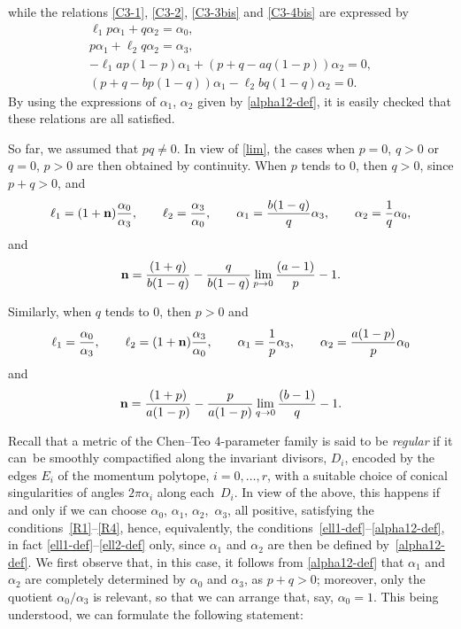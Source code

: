 \documentclass[10pt,a4paper]{amsart}
\numberwithin{equation}{section}
\begin{document}
while the relations \eqref{C3-1}, \eqref{C3-2}, \eqref{C3-3bis} and \eqref{C3-4bis} are expressed by
\begin{gather} \ell _1 p \alpha _1 + q \alpha _2 = \alpha _0, \label{R1}\\
 p \alpha _1 + \ell _2 q \alpha _2 = \alpha _3, \label{R2}\\
 - \ell _1 a p (1 - p) \alpha _1 + (p + q - a q (1 - p)) \alpha _2 = 0, \label{R3}\\
 (p + q - b p (1 - q)) \alpha _1 - \ell _2 b q (1 - q) \alpha _2 = 0.\label{R4} \end{gather}
By using the expressions of $\alpha _1$, $\alpha _2$ given by \eqref{alpha12-def}, it is easily checked that these relations are all satisfied.

 So far, we assumed that $p q \neq 0$. In view of \eqref{lim}, the cases when $p = 0$, $q > 0$ or $q = 0$, $p > 0$ are then obtained by continuity. When $p$ tends to $0$, then $q > 0$, since $p + q > 0$, and
\begin{gather*} \ell _1 = (1 + {\bf n}) \frac{\alpha _0}{\alpha _3}, \qquad \ell _2 = \frac{\alpha _3}{\alpha _0}, \qquad
 \alpha _1 = \frac{b (1 - q)}{q} \alpha _3, \qquad \alpha _2 = \frac{1}{q} \alpha _0, \end{gather*}
and
\begin{gather*} {\bf n} = \frac{(1 + q)}{b (1 - q)} - \frac{q}{b (1 - q)} \lim _{p \to 0}{\frac{(a - 1)}{p}} - 1. \end{gather*}

Similarly, when $q$ tends to $0$, then $p > 0$ and
\begin{gather*} \ell _1 = \frac{\alpha _0}{\alpha _3}, \qquad \ell _2 = (1 + {\bf n}) \frac{\alpha _3}{\alpha _0}, \qquad
 \alpha _1 = \frac{1}{p} \alpha _3, \qquad \alpha _2 = \frac{a (1 - p)}{p} \alpha _0 \end{gather*}
and
\begin{gather*} {\bf n} = \frac{(1 + p)}{a (1 - p)} - \frac{p}{a (1 - p)} \lim _{q \to 0}{\frac{(b - 1)}{q}} - 1. \end{gather*}


Recall that a metric of the Chen--Teo 4-parameter family is said to be {\it regular} if it can~be smoothly compactified along the invariant divisors, $D_i$, encoded by the edges $E_i$ of the momentum polytope, $i = 0, \dots, r$, with a suitable choice of conical singularities of angles $2 \pi \alpha _i$ along each~$D_i$. In view of the above, this happens if and only if we can choose $\alpha _0$, $\alpha _1$, $\alpha _2$,~$\alpha _3$, all positive, satisfying the conditions~\eqref{R1}--\eqref{R4}, hence, equivalently, the conditions~\eqref{ell1-def}--\eqref{alpha12-def}, in fact \eqref{ell1-def}--\eqref{ell2-def} only, since $\alpha _1$ and $\alpha _2$ are then be defined by~\eqref{alpha12-def}. We first observe that, in this case, it follows from \eqref{alpha12-def} that $\alpha _1$ and $\alpha _2$ are completely determined by $\alpha _0$ and $\alpha _3$, as $p + q > 0$; moreover, only the quotient $\alpha _0/\alpha _3$ is relevant, so that we can arrange that, say, $\alpha _0 = 1$.
 This being understood, we can formulate the following statement:
\end{document}
